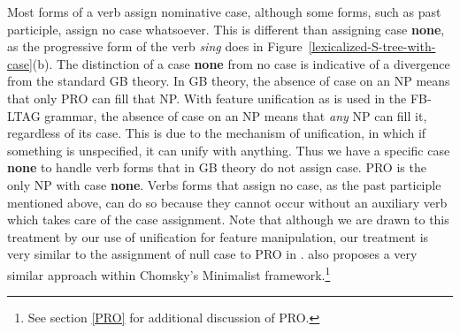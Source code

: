 Most forms of a verb assign nominative case, although some forms, such as past
participle, assign no case whatsoever.  This is different than assigning case
{\bf none}, as the progressive form of the verb {\it sing} does in
Figure~\ref{lexicalized-S-tree-with-case}(b).  The distinction of a case {\bf
none} from no case is indicative of a divergence from the standard GB theory.
In GB theory, the absence of case on an NP means that only PRO can fill that
NP.  With feature unification as is used in the FB-LTAG grammar, the absence of
case on an NP means that {\em any\/} NP can fill it, regardless of its case.
This is due to the mechanism of unification, in which if something is
unspecified, it can unify with anything.  Thus we have a specific case {\bf
none} to handle verb forms that in GB theory do not assign case.  PRO is the
only NP with case {\bf none}.  Verbs forms that assign no case, as the past
participle mentioned above, can do so because they cannot occur without an
auxiliary verb which takes care of the case assignment.  Note that although we
are drawn to this treatment by our use of unification for feature manipulation,
our treatment is very similar to the assignment of null case to PRO in
\cite{ChomskyLasnik93}.  \cite{watanabe93} also proposes a very similar 
approach within Chomsky's Minimalist framework.\footnote{See section \ref{PRO}
for additional discussion of PRO.}

